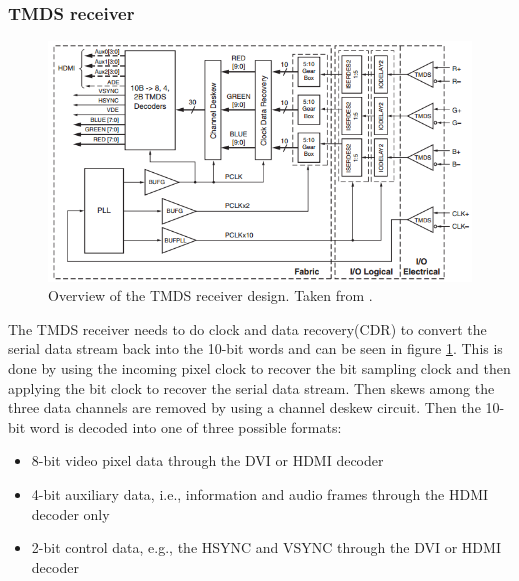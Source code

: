 \subsubsection{TMDS receiver}
\begin{figure}[h!]
    \centering
    \includegraphics[width=\linewidth]{img/TMDSreceiverdesign.png}
    \caption{Overview of the TMDS receiver design. Taken from \cite{xapp495}.}
    \label{fig:TMDSReceiver}
\end{figure}
The TMDS receiver needs to do clock and data recovery(CDR) to convert the serial data stream back into the 10-bit words and can be seen in figure \ref{fig:TMDSReceiver}.
This is done by using the incoming pixel clock to recover the bit sampling clock and then applying the bit clock to recover the serial data stream.
Then skews among the three data channels are removed by using a channel deskew circuit.
Then the 10-bit word is decoded into one of three possible formats:
\begin{itemize}
    \item   8-bit video pixel data through the DVI or HDMI decoder
    \item   4-bit auxiliary data, i.e., information and audio frames through the HDMI decoder only
    \item   2-bit control data, e.g., the HSYNC and VSYNC through the DVI or HDMI decoder
\end{itemize}

